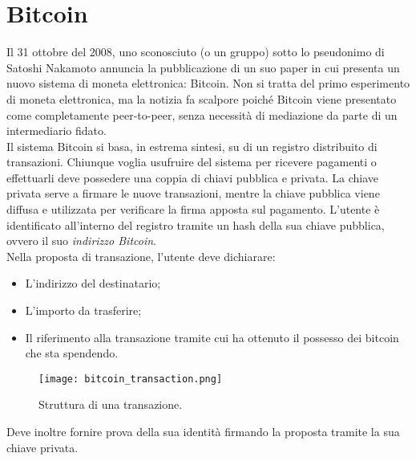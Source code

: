 \section{Bitcoin}
	Il 31 ottobre del 2008, uno sconosciuto (o un gruppo) sotto lo pseudonimo di Satoshi Nakamoto annuncia la pubblicazione di un suo paper \cite{nakamoto_bitcoin} in cui presenta un nuovo sistema di moneta elettronica: Bitcoin. Non si tratta del primo esperimento di moneta elettronica, ma la notizia fa scalpore poiché Bitcoin viene presentato come completamente peer-to-peer, senza necessità di mediazione da parte di un intermediario fidato. \\
	Il sistema Bitcoin si basa, in estrema sintesi, su di un registro distribuito di transazioni. Chiunque voglia usufruire del sistema per ricevere pagamenti o effettuarli deve possedere una coppia di chiavi pubblica e privata. La chiave privata serve a firmare le nuove transazioni, mentre la chiave pubblica viene diffusa e utilizzata per verificare la firma apposta sul pagamento. L'utente è identificato all'interno del registro tramite un hash della sua chiave pubblica, ovvero il suo \emph{indirizzo Bitcoin}. \\
	Nella proposta di transazione, l'utente deve dichiarare:
	\begin{itemize}
		\item L'indirizzo del destinatario;
		\item L'importo da trasferire;
		\item Il riferimento alla transazione tramite cui ha ottenuto il possesso dei bitcoin che sta spendendo.
	\end{itemize}
	\begin{figure}[ht]
		\centering
		\texttt{[image: bitcoin\_transaction.png]}
		\caption[Struttura di una transazione]{Struttura di una transazione.}
		\label{fig:bitcoin_transaction}
	\end{figure}
	Deve inoltre fornire prova della sua identità firmando la proposta tramite la sua chiave privata.
